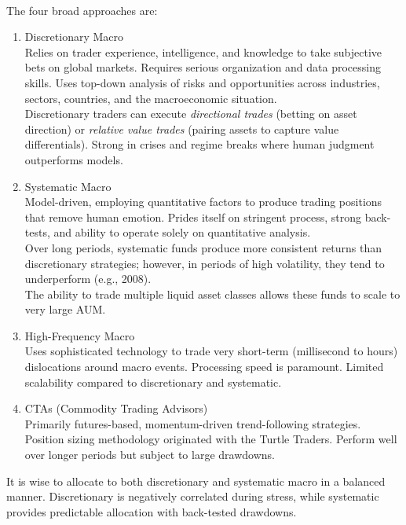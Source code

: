 \begin{remark} \\
The four broad approaches are:
\begin{enumerate}[label=\roman*.]
\setlength{\itemsep}{0pt}
\item Discretionary Macro\\
Relies on trader experience, intelligence, and knowledge to take subjective bets on global markets. Requires serious organization and data processing skills. Uses top-down analysis of risks and opportunities across industries, sectors, countries, and the macroeconomic situation.\\
Discretionary traders can execute \textit{directional trades} (betting on asset direction) or \textit{relative value trades} (pairing assets to capture value differentials). Strong in crises and regime breaks where human judgment outperforms models.
\item Systematic Macro\\
Model-driven, employing quantitative factors to produce trading positions that remove human emotion. Prides itself on stringent process, strong back-tests, and ability to operate solely on quantitative analysis.\\
Over long periods, systematic funds produce more consistent returns than discretionary strategies; however, in periods of high volatility, they tend to underperform (e.g., 2008).\\
The ability to trade multiple liquid asset classes allows these funds to scale to very large AUM.
\item High-Frequency Macro\\
Uses sophisticated technology to trade very short-term (millisecond to hours) dislocations around macro events. Processing speed is paramount. Limited scalability compared to discretionary and systematic.
\item CTAs (Commodity Trading Advisors)\\
Primarily futures-based, momentum-driven trend-following strategies. Position sizing methodology originated with the Turtle Traders. Perform well over longer periods but subject to large drawdowns.
\end{enumerate}
It is wise to allocate to both discretionary and systematic macro in a balanced manner. Discretionary is negatively correlated during stress, while systematic provides predictable allocation with back-tested drawdowns.
\end{remark}

